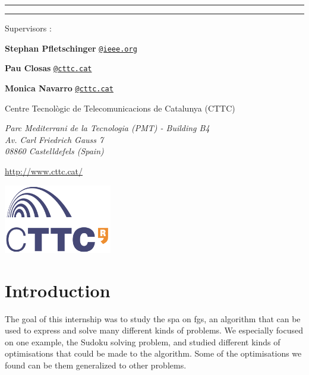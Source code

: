 \documentclass[a4paper,11pt]{report}
\begin{document}
\begin{center}

\vfill

\rule[11pt]{5cm}{0.5pt}

\textbf{\huge \thetitle}

\rule{5cm}{0.5pt}

\vfill

\vspace{2.5cm}

\parbox{15cm}{
Supervisors :

\textbf{Stephan Pfletschinger} \href{mailto:stephan.pfletschinger@ieee.org}{\tt @ieee.org}

\textbf{Pau Closas} \href{mailto:pau.closas@cttc.cat}{\tt @cttc.cat}

\textbf{Monica Navarro} \href{mailto:monica.navarro@cttc.cat}{\tt @cttc.cat}

Centre Tecnològic de Telecomunicacions de Catalunya (CTTC)

\textit{Parc Mediterrani de la Tecnologia (PMT) - Building B4\\
Av. Carl Friedrich Gauss 7\\
08860 Castelldefels (Spain)}

\url{http://www.cttc.cat/}
}

\vspace{1.5cm}

\hfill
\includegraphics[height=3cm]{logos/cttc.png}
\hfill \null

\end{center}


\tableofcontents
\newpage


\pagestyle{fancy}
\fancyhead[L]{\thetitle} 
\fancyhead[R]{\nouppercase{\textsl{\leftmark}}}

\chapter{Introduction}

The goal of this internship was to study the \acl{spa} on \aclp{fg}, an algorithm that can be used to express and solve many different kinds of problems. We especially focused on one example, the Sudoku solving problem, and studied different kinds of optimisations that could be made to the algorithm. Some of the optimisations we found can be them generalized to other problems.
\end{document}
